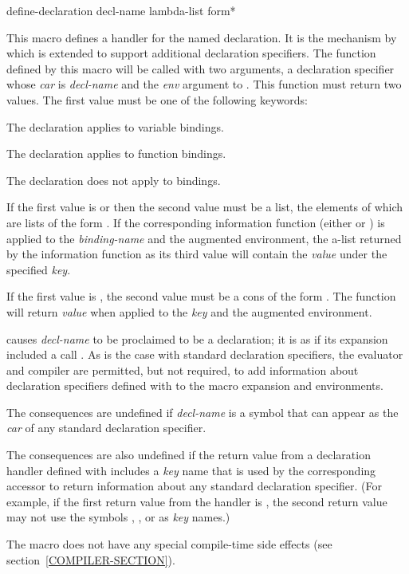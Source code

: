 \begin{defmac}
define-declaration decl-name lambda-list {form}*

  This macro defines a handler for the named declaration.  It is the mechanism by which
   is extended to support additional declaration
  specifiers.  The function defined by this macro will be called with two
  arguments, a declaration specifier whose \emph{car} is \emph{decl-name}
  and the \emph{env} argument to
  .  This function must return two values.  The
  first value must be one of the following keywords:
\begin{indentdesc}{7pc}
\item[\cd{:variable}]     The declaration applies to variable bindings.
\item[\cd{:function}]     The declaration applies to function bindings.
\item[\cd{:declare}]      The declaration does not apply to bindings.
\end{indentdesc}
If the first value is  or 
then the second value must be a list, the elements of which are lists of the
  form .  If the corresponding information
  function (either  or ) is applied to
  the \emph{binding-name} and the augmented environment, the a-list returned
  by the information function as its third value will contain the \emph{value}
  under the specified \emph{key}.

  If the first value is , the second value must be a cons
  of the form .  The function
   will return \emph{value} when applied to the
  \emph{key} and the augmented environment.

   causes \emph{decl-name} to be proclaimed to be a
  declaration; it is as if its expansion included a call .  As is the case with standard
  declaration specifiers, the evaluator and compiler are permitted,
  but not required, to add information about declaration specifiers
  defined with  to the macro expansion and 
  environments.

  The consequences are undefined if \emph{decl-name} is a symbol that can
  appear as the \emph{car} of any standard declaration specifier.

  The consequences are also undefined if the return value from a 
  declaration handler defined with  includes a \emph{key} name
  that is used by the corresponding accessor to return information about
  any standard declaration specifier.  (For example, if
  the first return value from the handler is , the second return
  value may not use the symbols , , or 
  as \emph{key} names.)

  The  macro does not have any special compile-time
  side effects (see section~\ref{COMPILER-SECTION}).
\end{defmac}

